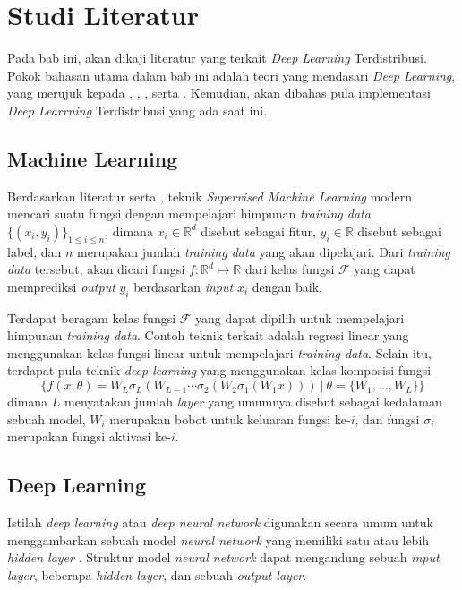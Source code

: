 \chapter{Studi Literatur}
Pada bab ini, akan dikaji literatur yang terkait \emph{Deep Learning} Terdistribusi. Pokok bahasan utama dalam bab ini adalah teori yang mendasari \emph{Deep Learning}, yang merujuk kepada \textcite{JiangDistributed}, \textcite{Choi2019}, \textcite{Fan2019}, serta \textcite{LeCun2015}. Kemudian, akan dibahas pula implementasi \emph{Deep Learrning} Terdistribusi yang ada saat ini.

\section{Machine Learning}
Berdasarkan literatur \textcite{Fan2019} serta \textcite{bishop2006pattern}, teknik \emph{Supervised Machine Learning} modern mencari suatu fungsi dengan mempelajari himpunan \emph{training data} $\{(x_i, y_i)\}_{1 \le i \le n}$, dimana $x_i \in \mathbb{R}^d$ disebut sebagai fitur,  $y_i \in \mathbb{R}$ disebut sebagai label, dan $n$ merupakan jumlah \emph{training data} yang akan dipelajari. Dari \emph{training data} tersebut, akan dicari fungsi $f: \mathbb{R}^d \mapsto \mathbb{R}$ dari kelas fungsi $\mathcal{F}$ yang dapat memprediksi \emph{output} $y_i$ berdasarkan \emph{input} $x_i$ dengan baik.

Terdapat beragam kelas fungsi \(\mathcal{F}\) yang dapat dipilih untuk mempelajari himpunan \emph{training data}. Contoh teknik terkait adalah regresi linear yang menggunakan kelas fungsi linear untuk mempelajari \emph{training data}. Selain itu, terdapat pula teknik \emph{deep learning} yang menggunakan kelas komposisi fungsi \parencite{LeCun2015}
\begin{equation}
  \{
  f(x;\theta) = W_L\sigma_L(W_{L-1} \cdots \sigma_2(W_2\sigma_1(W_1 x)))\ \vert \ \theta = \{W_1,\dots,W_L\}
  \}
\end{equation}
dimana $L$ menyatakan jumlah \emph{layer} yang umumnya disebut sebagai kedalaman sebuah model, $W_i$ merupakan bobot untuk keluaran fungsi ke-$i$, dan fungsi $\sigma_i$ merupakan fungsi aktivasi ke-$i$.

\section{Deep Learning}
Istilah \emph{deep learning} atau \emph{deep neural network} digunakan secara umum untuk menggambarkan sebuah model \emph{neural network} yang memiliki satu atau lebih \emph{hidden layer} \parencite{Fan2019,LeCun2015}. Struktur model \emph{neural network} dapat mengandung sebuah \emph{input layer}, beberapa \emph{hidden layer}, dan sebuah \emph{output layer}.

